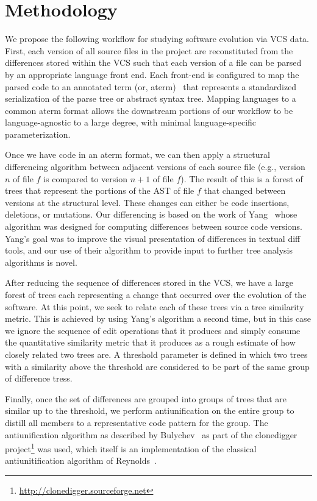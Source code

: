 
\section{Methodology}

We propose the following workflow for studying software evolution via VCS
data.  First, each version of all source files in the project are
reconstituted from the differences stored within the VCS such that each
version of a file can be parsed by an appropriate language front end.  Each
front-end is configured to map the parsed code to an annotated term (or,
aterm)~\cite{brand00aterm} that represents a standardized serialization of the
parse tree or abstract syntax tree.  Mapping languages to a common aterm
format allows the downstream portions of our workflow to be language-agnostic
to a large degree, with minimal language-specific parameterization.

Once we have code in an aterm format, we can then apply a structural
differencing algorithm between adjacent versions of each source file (e.g.,
version $n$ of file $f$ is compared to version $n+1$ of file $f$).  The result
of this is a forest of trees that represent the portions of the AST of file
$f$ that changed between versions at the structural level.  These changes can
either be code insertions, deletions, or mutations.  Our differencing is based
on the work of Yang~\cite{yang91diff} whose algorithm was designed for
computing differences between source code versions.  Yang's goal was to
improve the visual presentation of differences in textual diff tools, and our
use of their algorithm to provide input to further tree analysis algorithms is
novel.

After reducing the sequence of differences stored in the VCS, we have a large
forest of trees each representing a change that occurred over the evolution of
the software.  At this point, we seek to relate each of these trees via a
tree similarity metric.  This is achieved by using Yang's algorithm a second
time, but in this case we ignore the sequence of edit operations that it
produces and simply consume the quantitative similarity metric that it
produces as a rough estimate of how closely related two trees are.  A
threshold parameter is defined in which two trees with a similarity above the
threshold are considered to be part of the same group of difference tress.

Finally, once the set of differences are grouped into groups of trees that are
similar up to the threshold, we perform antiunification on the entire group to
distill all members to a representative code pattern for the group.  The
antiunification algorithm as described by Bulychev~\cite{bulychev08dupe} as
part of the clonedigger
project\footnote{\url{http://clonedigger.sourceforge.net}} was used, which
itself is an implementation of the classical antiunitification algorithm of
Reynolds~\cite{reynolds69antiunification}.

